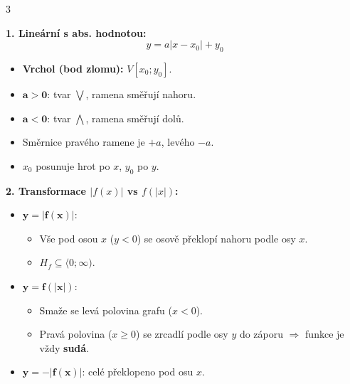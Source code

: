 \documentclass[9pt,a4paper]{article}
\begin{document}
\begin{tcolorbox}[secbox,title=OKRUH 5: ABSOLUTNÍ HODNOTA V ROVNICÍCH, NEROVNICÍCH A GRAFECH]
\begin{multicols}{3}

\textbf{1. Lineární s abs. hodnotou:}
\[y = a|x - x_0| + y_0\]
\begin{itemize}
  \item \textbf{Vrchol (bod zlomu):} $V[x_0; y_0]$.
  \item $\mathbf{a > 0}$: tvar $\bigvee$, ramena směřují nahoru.
  \item $\mathbf{a < 0}$: tvar $\bigwedge$, ramena směřují dolů.
  \item Směrnice pravého ramene je $+a$, levého $-a$.
  \item $x_0$ posunuje hrot po $x$, $y_0$ po $y$.
\end{itemize}

\begin{center}
\end{center}

\columnbreak

\textbf{2. Transformace $|f(x)|$ vs $f(|x|)$:}
\begin{itemize}
  \item $\mathbf{y = |f(x)|}$:
  \begin{itemize}
    \item Vše pod osou $x$ ($y < 0$) se osově překlopí nahoru podle osy $x$.
    \item $H_f \subseteq \langle 0; \infty)$.
  \end{itemize}
  \item $\mathbf{y = f(|x|)}$:
  \begin{itemize}
    \item Smaže se levá polovina grafu ($x < 0$).
    \item Pravá polovina ($x \ge 0$) se zrcadlí podle osy $y$ do záporu $\Rightarrow$ funkce je vždy \textbf{sudá}.
  \end{itemize}
  \item $\mathbf{y = -|f(x)|}$: celé překlopeno pod osu $x$.
\end{itemize}


\end{multicols}
\end{tcolorbox}
\end{document}
